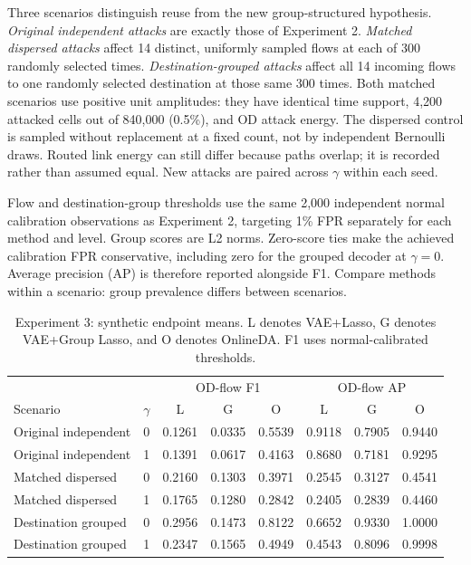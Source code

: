 \documentclass[12pt]{article}
\begin{document}
Three scenarios distinguish reuse from the new group-structured hypothesis.
\emph{Original independent attacks} are exactly those of Experiment 2.
\emph{Matched dispersed attacks} affect 14 distinct, uniformly sampled flows
at each of 300 randomly selected times. \emph{Destination-grouped attacks}
affect all 14 incoming flows to one randomly selected destination at those
same 300 times. Both matched scenarios use positive unit amplitudes: they
have identical time support, 4,200 attacked cells out of 840,000 (0.5\%), and
OD attack energy. The dispersed control is sampled without replacement at a
fixed count, not by independent Bernoulli draws. Routed link energy can still
differ because paths overlap; it is recorded rather than assumed equal.
New attacks are paired across $\gamma$ within each seed.

Flow and destination-group thresholds use the same 2,000 independent normal
calibration observations as Experiment 2, targeting 1\% FPR separately for
each method and level. Group scores are L2 norms. Zero-score ties make the
achieved calibration FPR conservative, including zero for the grouped decoder
at $\gamma=0$. Average precision (AP) is therefore reported alongside F1.
Compare methods within a scenario: group prevalence differs between scenarios.

\begin{table}[H]
\centering
\caption{Experiment 3: synthetic endpoint means. L denotes VAE+Lasso,
G denotes VAE+Group Lasso, and O denotes OnlineDA. F1 uses normal-calibrated
thresholds.}
\small
\setlength{\tabcolsep}{4pt}
\begin{tabular}{llcccccc}
\toprule
 & & \multicolumn{3}{c}{OD-flow F1} & \multicolumn{3}{c}{OD-flow AP} \\
Scenario & $\gamma$ & L & G & O & L & G & O \\
\midrule
Original independent & 0 & 0.1261 & 0.0335 & 0.5539 & 0.9118 & 0.7905 & 0.9440 \\
Original independent & 1 & 0.1391 & 0.0617 & 0.4163 & 0.8680 & 0.7181 & 0.9295 \\
Matched dispersed & 0 & 0.2160 & 0.1303 & 0.3971 & 0.2545 & 0.3127 & 0.4541 \\
Matched dispersed & 1 & 0.1765 & 0.1280 & 0.2842 & 0.2405 & 0.2839 & 0.4460 \\
Destination grouped & 0 & 0.2956 & 0.1473 & 0.8122 & 0.6652 & 0.9330 & 1.0000 \\
Destination grouped & 1 & 0.2347 & 0.1565 & 0.4949 & 0.4543 & 0.8096 & 0.9998 \\
\bottomrule
\end{tabular}
\label{tab:exp3_synthetic}
\end{table}
\end{document}
